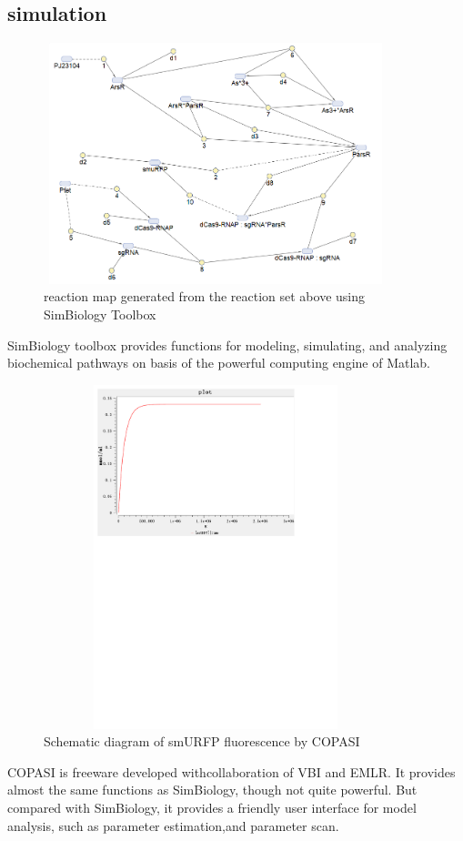 \subsection{simulation }
\begin{figure}[h]
	\centering
	\includegraphics[width=10cm,height=7cm]{screenshot003}	
	\caption{reaction map generated from the reaction set above using SimBiology Toolbox}
\end{figure}
SimBiology toolbox provides functions for modeling, simulating, and analyzing biochemical pathways on basis of the powerful computing engine of Matlab.

\begin{figure}[h]
	\centering
	\includegraphics[width=10cm,height=10cm]{smuRFP}
	\caption{Schematic diagram of smURFP fluorescence by COPASI}
\end{figure}



COPASI is freeware developed withcollaboration of VBI and EMLR. It provides
almost the same functions as SimBiology, though not quite powerful. But compared with SimBiology, it provides a friendly user interface for model analysis, such as parameter estimation,and parameter scan.

